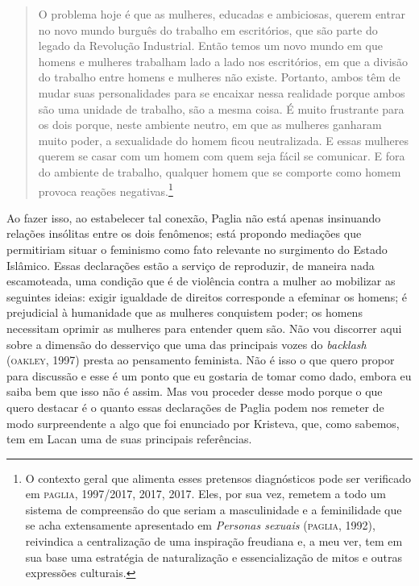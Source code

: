 \begin{quote}
O problema hoje é que as mulheres, educadas e ambiciosas, querem
entrar no novo mundo burguês do trabalho em escritórios, que são parte
do legado da Revolução Industrial. Então temos um novo mundo em que
homens e mulheres trabalham lado a lado nos escritórios, em que a
divisão do trabalho entre homens e mulheres não existe. Portanto, ambos
têm de mudar suas personalidades para se encaixar nessa realidade porque
ambos são uma unidade de trabalho, são a mesma coisa. É muito frustrante
para os dois porque, neste ambiente neutro, em que as mulheres ganharam
muito poder, a sexualidade do homem ficou neutralizada. E essas mulheres
querem se casar com um homem com quem seja fácil se comunicar. E fora do
ambiente de trabalho, qualquer homem que se comporte como homem provoca
reações negativas.\footnote{O contexto geral que alimenta esses
  pretensos diagnósticos pode ser verificado em \textsc{paglia}, 1997/2017,
  2017, 2017. Eles, por sua vez, remetem a todo um sistema de
  compreensão do que seriam a masculinidade e a feminilidade que se acha
  extensamente apresentado em \emph{Personas sexuais} (\textsc{paglia},
  1992), reivindica a centralização de uma inspiração freudiana e,
  a meu ver, tem em sua base uma estratégia de naturalização e
  essencialização de mitos e outras expressões culturais.}
\end{quote}

Ao fazer isso, ao estabelecer tal conexão, Paglia não está apenas
insinuando relações insólitas entre os dois fenômenos; está propondo
mediações que permitiriam situar o feminismo como fato relevante no
surgimento do Estado Islâmico. Essas declarações estão a serviço de
reproduzir, de maneira nada escamoteada, uma condição que é de violência
contra a mulher ao mobilizar as seguintes ideias: exigir igualdade de
direitos corresponde a efeminar os homens; é prejudicial à humanidade
que as mulheres conquistem poder; os homens necessitam oprimir as
mulheres para entender quem são. Não vou discorrer aqui sobre a dimensão
do desserviço que uma das principais vozes do \emph{backlash} (\textsc{oakley},
  1997) presta ao pensamento feminista. Não é isso o que quero propor para
discussão e esse é um ponto que eu gostaria de tomar como dado, embora
eu saiba bem que isso não é assim. Mas vou proceder desse modo porque o
que quero destacar é o quanto essas declarações de Paglia podem nos
remeter de modo surpreendente a algo que foi enunciado por Kristeva,
que, como sabemos, tem em Lacan uma de suas principais referências.

